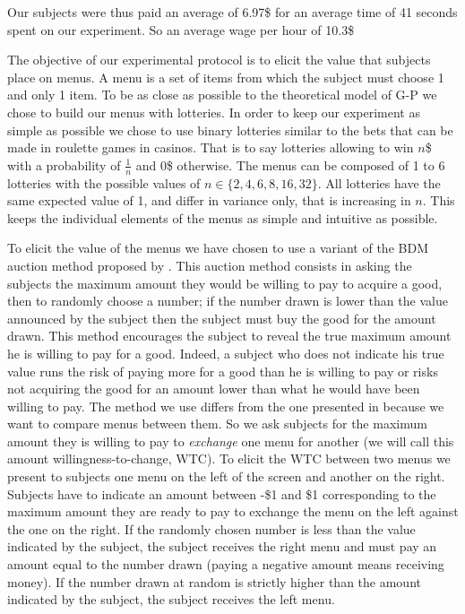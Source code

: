 \documentclass[
]{book}
\begin{document}
Our subjects were thus paid an average of 6.97\$ for
an average time of 41 seconds spent on our experiment.
So an average wage per hour of
10.3\$

The objective of our experimental protocol is to elicit the value that subjects
place on menus.
A menu is a set of items from which the subject must choose 1 and only 1 item.
To be as close as possible to the theoretical model of G-P we chose to build our
menus with lotteries.
In order to keep our experiment as simple as possible we chose to use binary
lotteries similar to the bets that can be made in roulette games in casinos.
That is to say lotteries allowing to win \(n\)\$ with a probability of \(\frac{1}{n}\)
and 0\$ otherwise.
The menus can be composed of 1 to 6 lotteries with the possible values of
\(n \in \{2, 4, 6, 8, 16, 32\}\).
All lotteries have the same expected value of 1, and differ in variance only,
that is increasing in \(n\).
This keeps the individual elements of the menus as simple and intuitive as
possible.

To elicit the value of the menus we have chosen to use a variant of the BDM auction
method proposed by \citet{becker1964measuring}.
This auction method consists in asking the subjects the maximum amount they
would be willing to pay to acquire a good, then to randomly choose a number;
if the number drawn is lower than the value announced by the subject then the
subject must buy the good for the amount drawn.
This method encourages the subject to reveal the true maximum amount he is willing to
pay for a good.
Indeed, a subject who does not indicate his true value runs the risk of paying
more for a good than he is willing to pay or risks not acquiring the good for an
amount lower than what he would have been willing to pay.
The method we use differs from the one presented in \citet{becker1964measuring} because
we want to compare menus between them.
So we ask subjects for the maximum amount they is willing to pay to \emph{exchange} one
menu for another (we will call this amount willingness-to-change, WTC).
To elicit the WTC between two menus we present to subjects one menu on
the left of the screen and another on the right. Subjects have to indicate an amount
between -\$1 and \$1 corresponding to the maximum amount they are ready to pay to
exchange the menu on the left against the one on the right.
If the randomly chosen number is less than the value indicated by the subject,
the subject receives the right menu and must pay an amount equal to the number
drawn (paying a negative amount means receiving money).
If the number drawn at random is strictly higher than the amount indicated by
the subject, the subject receives the left menu.
\end{document}
